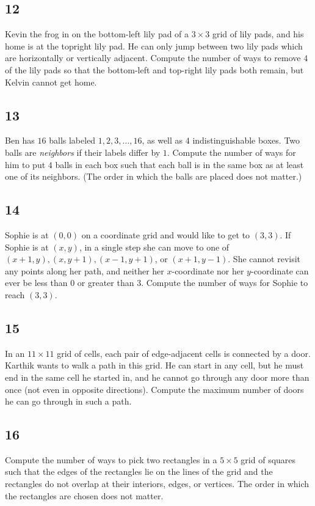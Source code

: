 \subsection{12}
Kevin the frog in on the bottom-left lily pad of a $3 \times 3$ grid of lily pads, and his home is at the topright lily pad. He can only jump between two lily pads which are horizontally or vertically adjacent. Compute the number of ways to remove $4$ of the lily pads so that the bottom-left and top-right lily pads both remain, but Kelvin cannot get home.

\subsection{13}
Ben has $16$ balls labeled $1,2,3, \ldots, 16$, as well as $4$ indistinguishable boxes. Two balls are \emph{neighbors} if their labels differ by $1$. Compute the number of ways for him to put $4$ balls in each box such that each ball is in the same box as at least one of its neighbors. (The order in which the balls are placed does not matter.)

\subsection{14}
Sophie is at $(0,0)$ on a coordinate grid and would like to get to $(3,3)$. If Sophie is at $(x, y)$, in a single step she can move to one of $(x+1, y),(x, y+1),(x-1, y+1)$, or $(x+1, y-1)$. She cannot revisit any points along her path, and neither her $x$-coordinate nor her $y$-coordinate can ever be less than $0$ or greater than 3. Compute the number of ways for Sophie to reach $(3,3)$.

\subsection{15}
In an $11 \times 11$ grid of cells, each pair of edge-adjacent cells is connected by a door. Karthik wants to walk a path in this grid. He can start in any cell, but he must end in the same cell he started in, and he cannot go through any door more than once (not even in opposite directions). Compute the maximum number of doors he can go through in such a path.

\subsection{16}
Compute the number of ways to pick two rectangles in a $5 \times 5$ grid of squares such that the edges of the rectangles lie on the lines of the grid and the rectangles do not overlap at their interiors, edges, or vertices. The order in which the rectangles are chosen does not matter.

